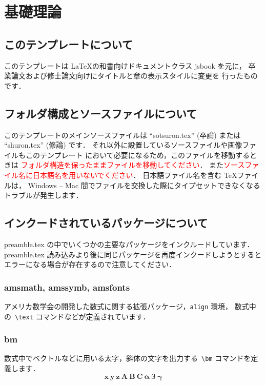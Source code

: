 \documentclass[dvipdfmx,report,disablejfam,nosetpagesize,12pt]{jsbook}
\begin{document}
\chapter{基礎理論} \label{Chap.basis}
\section{このテンプレートについて} \label{Sec.basis}
このテンプレートは \LaTeX の和書向けドキュメントクラス jsbook を元に，
卒業論文および修士論文向けにタイトルと章の表示スタイルに変更を
行ったものです．

\section{フォルダ構成とソースファイルについて}
このテンプレートのメインソースファイルは
``sotsuron.tex'' (卒論) または ``shuron.tex'' (修論) です．
それ以外に設置しているソースファイルや画像ファイルもこのテンプレート
において必要になるため，このファイルを移動するときは
\textcolor{red}{フォルダ構造を保ったままファイルを移動してください}．
また\textcolor{red}{ソースファイル名に日本語名を用いないでください}．
日本語ファイル名を含む \TeX ファイルは，
Windows -- Mac 間でファイルを交換した際にタイプセットできなくなる
トラブルが発生します．

\section{インクードされているパッケージについて}
preamble.tex の中でいくつかの主要なパッケージをインクルードしています．
preamble.tex 読み込みより後に同じパッケージを再度インクードしようとすると
エラーになる場合が存在するので注意してください．

\subsection*{amsmath, amssymb, amsfonts}
アメリカ数学会の開発した数式に関する拡張パッケージ，\verb+align+ 環境，
数式中の\ \verb+\text+ コマンドなどが定義されています．

\subsection*{bm}
数式中でベクトルなどに用いる太字，斜体の文字を出力する\ \verb+\bm+ 
コマンドを定義します．
\begin{equation}
   \bm{x}\ \bm{y\ z}\ \bm{A\ B\ C}\ \bm{\alpha\ \beta\ \gamma}
\end{equation}
\end{document}
